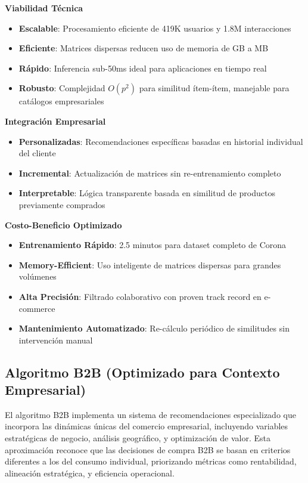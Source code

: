 \documentclass[twocolumn]{article}
\begin{document}
\textbf{Viabilidad Técnica}
\begin{itemize}
    \item \textbf{Escalable}: Procesamiento eficiente de 419K usuarios y 1.8M interacciones
    \item \textbf{Eficiente}: Matrices dispersas reducen uso de memoria de GB a MB
    \item \textbf{Rápido}: Inferencia sub-50ms ideal para aplicaciones en tiempo real
    \item \textbf{Robusto}: Complejidad \(O(p^2)\) para similitud ítem-ítem, manejable para catálogos empresariales
\end{itemize}

\textbf{Integración Empresarial}
\begin{itemize}
    \item \textbf{Personalizadas}: Recomendaciones específicas basadas en historial individual del cliente
    \item \textbf{Incremental}: Actualización de matrices sin re-entrenamiento completo
    \item \textbf{Interpretable}: Lógica transparente basada en similitud de productos previamente comprados
\end{itemize}

\textbf{Costo-Beneficio Optimizado}
\begin{itemize}
    \item \textbf{Entrenamiento Rápido}: 2.5 minutos para dataset completo de Corona
    \item \textbf{Memory-Efficient}: Uso inteligente de matrices dispersas para grandes volúmenes
    \item \textbf{Alta Precisión}: Filtrado colaborativo con proven track record en e-commerce
    \item \textbf{Mantenimiento Automatizado}: Re-cálculo periódico de similitudes sin intervención manual
\end{itemize}

\subsection{Algoritmo B2B (Optimizado para Contexto Empresarial)}

El algoritmo B2B implementa un sistema de recomendaciones especializado que incorpora las dinámicas únicas del comercio empresarial, incluyendo variables estratégicas de negocio, análisis geográfico, y optimización de valor. Esta aproximación reconoce que las decisiones de compra B2B se basan en criterios diferentes a los del consumo individual, priorizando métricas como rentabilidad, alineación estratégica, y eficiencia operacional.
\end{document}
